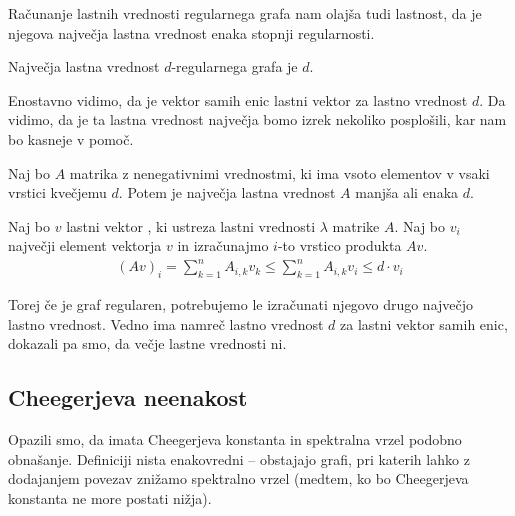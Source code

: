 Računanje lastnih vrednosti regularnega grafa nam olajša tudi lastnost, da je njegova največja lastna vrednost enaka stopnji regularnosti.
\begin{izrek}
    Največja lastna vrednost \(d\)-regularnega grafa je \(d\).
\end{izrek}

Enostavno vidimo, da je vektor samih enic lastni vektor za lastno vrednost \(d\). Da vidimo, da je ta lastna vrednost največja bomo izrek nekoliko posplošili, kar nam bo kasneje v pomoč.
\begin{izrek}\label{def-najvecja-lv}
    Naj bo \(A\) matrika z nenegativnimi vrednostmi, ki ima vsoto elementov v vsaki vrstici kvečjemu \(d\). Potem je največja lastna vrednost \(A\) manjša ali enaka \(d\).
\end{izrek}
\begin{dokaz}
    Naj bo \(v\) lastni vektor , ki ustreza lastni vrednosti \(\lambda\) matrike \(A\). Naj bo \(v_i\) največji element vektorja \(v\) in izračunajmo \(i\)-to vrstico produkta \(Av\).
    \begin{align*}
        (Av)_i = \sum_{k=1}^n A_{i,k}v_k \leq \sum_{k=1}^n A_{i,k}v_i \leq d\cdot v_i
    \end{align*}
\end{dokaz}
%
Torej če je graf regularen, potrebujemo le izračunati njegovo drugo največjo lastno vrednost. Vedno ima namreč lastno vrednost \(d\) za lastni vektor samih enic, dokazali pa smo, da večje lastne vrednosti ni.
\subsection{Cheegerjeva neenakost}
Opazili smo, da imata Cheegerjeva konstanta in spektralna vrzel podobno obnašanje. Definiciji nista enakovredni -- obstajajo grafi, pri katerih lahko z dodajanjem povezav znižamo spektralno vrzel (medtem, ko bo Cheegerjeva konstanta ne more postati nižja).

